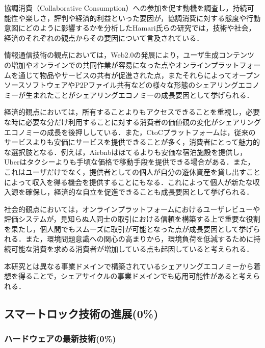           \par 協調消費（Collaborative Consumption）への参加を促す動機を調査し，持続可能性や楽しさ，評判や経済的利益といった要因が，協調消費に対する態度や行動意図にどのように影響するかを分析したHamari氏らの研究では，技術や社会，経済のそれぞれの観点からその要因について言及されている．
          \par 情報通信技術の観点においては，Web2.0の発展により，ユーザ生成コンテンツの増加やオンラインでの共同作業が容易になった点やオンラインプラットフォームを通じて物品やサービスの共有が促進された点，またそれらによってオープンソースソフトウェアやP2Pファイル共有などの様々な形態のシェアリングエコノミーが生まれたことがシェアリングエコノミーの成長要因として挙げられる．
          \par 経済的観点においては，所有することよりもアクセスできることを重視し，必要な時に必要な分だけ利用することに対する消費者の価値観の変化がシェアリングエコノミーの成長を後押ししている．また，CtoCプラットフォームは，従来のサービスよりも安価にサービスを提供できることが多く，消費者にとって魅力的な選択肢となる．例えば，Airbnbはほてるよりも安価な宿泊施設を提供し，Uberはタクシーよりも手頃な価格で移動手段を提供できる場合がある．また，これはユーザだけでなく，提供者としての個人が自分の遊休資産を貸し出すことによって収入を得る機会を提供することにもなる．これによって個人が新たな収入源を確保し，経済的な自立を促進できることも成長要因として挙げられる．
          \par 社会的観点においては，オンラインプラットフォームにおけるユーザレビューや評価システムが，見知らぬ人同士の取引における信頼を構築する上で重要な役割を果たし，個人間でもスムーズに取引が可能となった点が成長要因として挙げられる．また，環境問題意識への関心の高まりから，環境負荷を低減するために持続可能な消費を求める消費者が増加している点も起因していると考えられる．
          \par 本研究とは異なる事業ドメインで構築されているシェアリングエコノミーから着想を得ることで，シェアサイクルの事業ドメインでも応用可能性があると考えられる．
      
  \subsection{スマートロック技術の進展(0\%)}
    \label{sec:スマートロック技術の進展}
      \par
      
      \subsubsection{ハードウェアの最新技術(0\%)}
        \label{sec:ハードウェアの最新技術}
          \par
          
